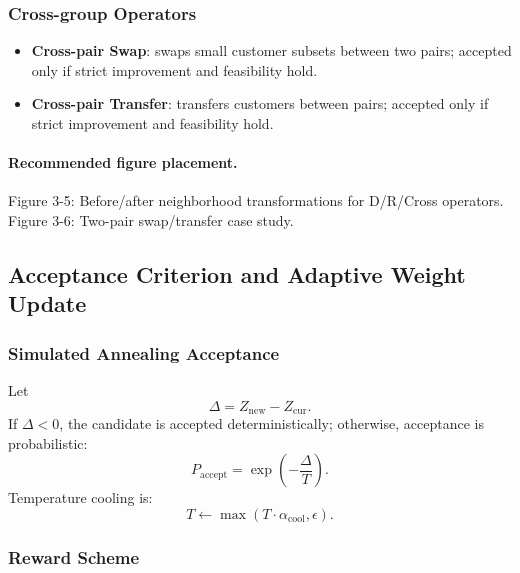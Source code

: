 \documentclass[review,12pt]{elsarticle}
\begin{document}
\subsubsection{Cross-group Operators}
\begin{itemize}
  \item \textbf{Cross-pair Swap}: swaps small customer subsets between two pairs; accepted only if strict improvement and feasibility hold.
  \item \textbf{Cross-pair Transfer}: transfers customers between pairs; accepted only if strict improvement and feasibility hold.
\end{itemize}

\paragraph{Recommended figure placement.}
Figure 3-5: Before/after neighborhood transformations for D/R/Cross operators.\\
Figure 3-6: Two-pair swap/transfer case study.

\subsection{Acceptance Criterion and Adaptive Weight Update}
\label{subsec:acceptance}

\subsubsection{Simulated Annealing Acceptance}

Let
\begin{equation}
\Delta = Z_{\mathrm{new}} - Z_{\mathrm{cur}}.
\label{eq:delta_def}
\end{equation}
If \(\Delta < 0\), the candidate is accepted deterministically; otherwise, acceptance is probabilistic:
\begin{equation}
P_{\mathrm{accept}} = \exp\!\left(-\frac{\Delta}{T}\right).
\label{eq:metropolis}
\end{equation}
Temperature cooling is:
\begin{equation}
T \leftarrow \max(T\cdot \alpha_{\mathrm{cool}},\epsilon).
\label{eq:cooling}
\end{equation}

\subsubsection{Reward Scheme}
\end{document}
